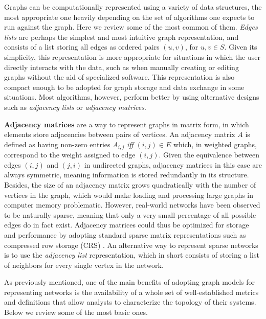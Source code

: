Graphs can be computationally represented using a variety of data structures, the most appropriate one heavily depending on the set of algorithms one expects to run against the graph.
Here we review some of the most common of them.
%
\textit{Edges lists} are perhaps the simplest and most intuitive graph representation, and consists of a list storing all edges as ordered pairs $(u,v)$, for $u,v \in S$.
Given its simplicity, this representation is more appropriate for situations in which the user directly interacts with the data, such as when manually creating or editing graphs without the aid of specialized software. 
This representation is also compact enough to be adopted for graph storage and data exchange in some situations.
%
Most algorithms, however, perform better by using alternative designs such as \textit{adjacency lists} or \textit{adjacency matrices}. 

\textbf{Adjacency matrices} are a way to represent graphs in matrix form, in which elements store adjacencies between pairs of vertices.
An adjacency matrix $A$ is defined as having non-zero entries $A_{i,j}$\textit{ iff } $(i,j)\in E$ which, in weighted graphs, correspond to the weight assigned to edge $(i,j)$.
Given the equivalence between edges $(i,j)$ and $(j,i)$ in undirected graphs, adjacency matrices in this case are always symmetric, meaning information is stored redundantly in its structure.
%
Besides, the size of an adjacency matrix grows quadratically with the number of vertices in the graph, which would make loading and processing large graphs in computer memory problematic.
However, real-world networks have been observed to be naturally sparse, meaning that only a very small percentage of all possible edges do in fact exist.
Adjacency matrices could thus be optimized for storage and performance by adopting standard sparse matrix representations such as compressed row storage (CRS) \cite{Saad2003}.
An alternative way to represent sparse networks is to use the \textit{adjacency list} representation, which in short consists of storing a list of neighbors for every single vertex in the network. 


As previously mentioned, one of the main benefits of adopting graph models for representing networks is the availability of a whole set of well-established metrics and definitions that allow analysts to characterize the topology of their systems. 
Below we review some of the most basic ones.

